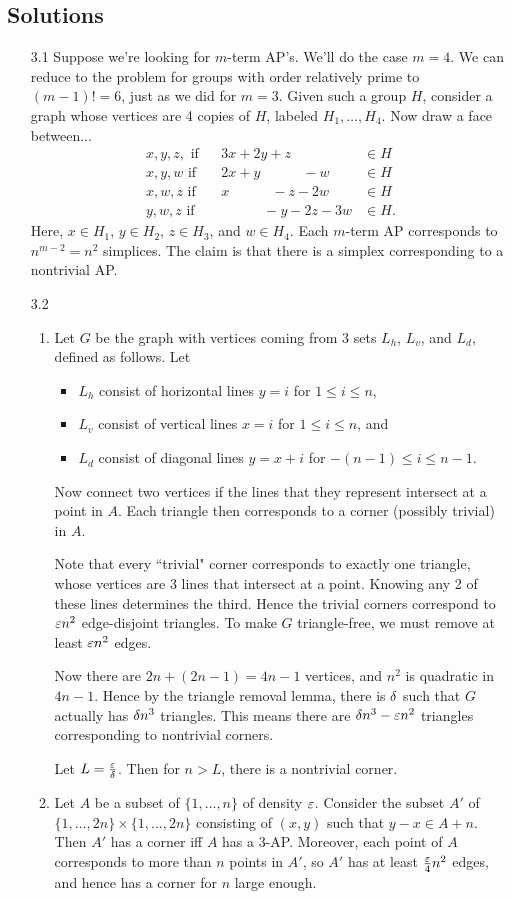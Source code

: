\subsection{Solutions}
\begin{enumerate}
\item[3.1] Suppose we're looking for $m$-term AP's. We'll do the case $m=4$. We can reduce to the problem for groups with order relatively prime to $(m-1)!=6$, just as we did for $m=3$. Given such a group $H$, consider a graph whose vertices are 4 copies of $H$, labeled $H_1,\ldots, H_4$. Now draw a face between...
\begin{align*}
x,y,z,\text{ if}&&3x+2y+z\quad\qquad &\in H\\
x,y,w\text{ if}&&2x+y\quad \qquad -w&\in H\\
x,w,z\text{ if}&&x\quad \qquad -z-2w&\in H\\
y,w,z\text{ if}&&\quad \qquad -y-2z-3w&\in H.
\end{align*}
Here, $x\in H_1$, $y\in H_2$, $z\in H_3$, and $w\in H_4$.
Each $m$-term AP corresponds to $n^{m-2}=n^2$ simplices. The claim is that there is a simplex corresponding to a nontrivial AP.
\item[3.2] 
\begin{enumerate}
\item
Let $G$ be the graph with vertices coming from 3 sets $L_h$, $L_v$, and $L_d$, defined as follows. Let
\begin{itemize}
\item
$L_h$ consist of horizontal lines $y=i$ for $1\le i \le n$,
\item
$L_v$ consist of vertical lines $x=i$ for $1\le i\le n$, and 
\item
$L_d$ consist of diagonal lines $y=x+i$ for $-(n-1)\le i\le n-1$.
\end{itemize}
Now connect two vertices if the lines that they represent intersect at a point in $A$.
Each triangle then corresponds to a corner (possibly trivial) in $A$.

Note that every ``trivial" corner corresponds to exactly one triangle, whose vertices are 3 lines that intersect at a point. Knowing any 2 of these lines determines the third. Hence the trivial corners correspond to $\varepsilon n^2$ edge-disjoint triangles. To make $G$ triangle-free, we must remove at least $\varepsilon n^2$ edges.

Now there are $2n+(2n-1)=4n-1$ vertices, and $n^2$ is quadratic in $4n-1$. Hence by the triangle removal lemma, there is $\delta$ such that $G$ actually has $\delta n^3$ triangles. This means there are $\delta n^3-\varepsilon n^2$ triangles corresponding to nontrivial corners.

Let $L=\frac{\varepsilon}{\delta}$. Then for $n>L$, there is a nontrivial corner.
\item
Let $A$ be a subset of $\{1,\ldots, n\}$ of density $\varepsilon$. Consider the subset $A'$ of $\{1,\ldots,2n\}\times \{1,\ldots,2n\}$ consisting of $(x,y)$ such that $y-x\in A+n$. Then $A'$ has a corner iff $A$ has a 3-AP. Moreover, each point of $A$ corresponds to more than $n$ points in $A'$, so $A'$ has at least $\frac{\varepsilon}{4}n^2$ edges, and hence has a corner for $n$ large enough.
\end{enumerate}
\end{enumerate}